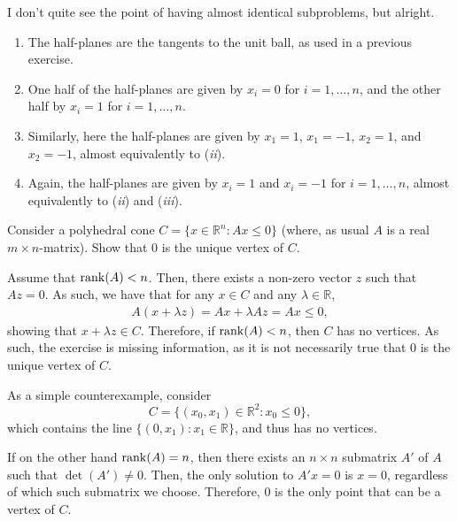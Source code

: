 \documentclass[
  a4paper,
  12pt,
]{article}
\numberwithin{equation}{section}
\begin{document}
\begin{solution}
  I don't quite see the point of having almost identical subproblems, but alright.
  \begin{enumerate}[label = (\emph{\roman*})]
    \item The half-planes are the tangents to the unit ball, as used in a previous exercise.
    \item One half of the half-planes are given by $x_i = 0$ for $i = 1, \ldots, n$, and the other half by $x_i = 1$ for $i = 1, \ldots, n$.
    \item Similarly, here the half-planes are given by $x_1 = 1$, $x_1 = -1$, $x_2 = 1$, and $x_2 = -1$, almost equivalently to (\emph{ii}).
    \item Again, the half-planes are given by $x_i = 1$ and $x_i = -1$ for $i = 1, \ldots, n$, almost equivalently to (\emph{ii}) and (\emph{iii}).
  \end{enumerate}
\end{solution}

\setcounter{section}{4}

\begin{exercise}
  Consider a polyhedral cone $C = \{x \in \mathbb{R}^n : Ax \leq 0\}$ (where, as usual $A$ is a real $m \times n$-matrix).
  Show that $0$ is the unique vertex of $C$.
\end{exercise}

\begin{solution}
  Assume that $\operatorname*{rank}(A) < n$.
  Then, there exists a non-zero vector $z$ such that $Az = 0$.
  As such, we have that for any $x \in C$ and any $\lambda \in \mathbb{R}$,
  \begin{align*}
    A(x + \lambda z) = Ax + \lambda Az = Ax \leq 0,
  \end{align*}
  showing that $x + \lambda z \in C$.
  Therefore, if $\operatorname*{rank}(A) < n$, then $C$ has no vertices.
  As such, the exercise is missing information, as it is not necessarily true that $0$ is the unique vertex of $C$.

  As a simple counterexample, consider
  \begin{equation}
    C = \{ (x_0, x_1) \in \mathbb{R}^2 : x_0 \leq 0 \},
  \end{equation}
  which contains the line $\{ (0, x_1) : x_1 \in \mathbb{R} \}$, and thus has no vertices.

  If on the other hand $\operatorname*{rank}(A) = n$, then there exists an $n \times n$ submatrix $A'$ of $A$ such that $\det(A') \neq 0$.
  Then, the only solution to $A'x = 0$ is $x = 0$, regardless of which such submatrix we choose.
  Therefore, $0$ is the only point that can be a vertex of $C$.
\end{solution}
\end{document}
